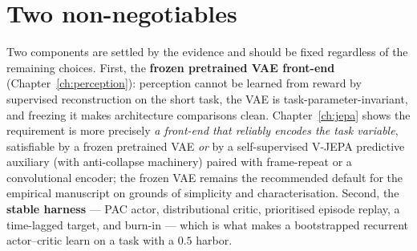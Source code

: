 \section{Two non-negotiables}
Two components are settled by the evidence and should be fixed regardless of the remaining
choices. First, the \textbf{frozen pretrained VAE front-end} (Chapter~\ref{ch:perception}):
perception cannot be learned from reward by supervised reconstruction on the short task, the
VAE is task-parameter-invariant, and freezing it makes architecture comparisons clean.
Chapter~\ref{ch:jepa} shows the requirement is more precisely \emph{a front-end that reliably
encodes the task variable}, satisfiable by a frozen pretrained VAE \emph{or} by a
self-supervised V-JEPA predictive auxiliary (with anti-collapse machinery) paired with
frame-repeat or a convolutional encoder; the frozen VAE remains the recommended default for
the empirical manuscript on grounds of simplicity and characterisation. Second, the \textbf{stable
harness} --- PAC actor, distributional critic, prioritised episode replay, a time-lagged
target, and burn-in --- which is what makes a bootstrapped recurrent actor--critic learn on
a task with a $0.5$ harbor.

